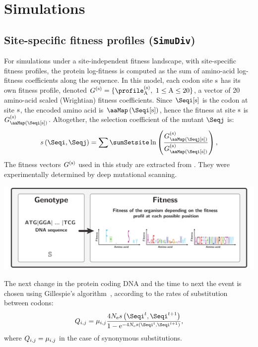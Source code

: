 \documentclass{article}
\begin{document}
	\section{Simulations}
	\label{sec:supp-mat-simulations}

	\subsection{Site-specific fitness profiles (\texttt{SimuDiv})}
	\label{subsec:independent-fitness-profiles}
	For simulations under a site-independent fitness landscape, with site-specific fitness profiles, the protein log-fitness is computed as the sum of amino-acid log-fitness coefficients along the sequence.
	In this model, each {codon} site $\text{s}$ has its own fitness profile, denoted $\Profile\siteexp = \{ \profile\siteexp_{\aminoacid},\ 1 \leq \aminoacid \leq 20 \}$, a vector of 20 amino-acid scaled (Wrightian) fitness coefficients.
	Since $\Seqi[ \site ]$ is the {codon} at site $\text{s}$, the encoded amino acid is $\aaMap \left( \Seqi[ \site ] \right)$, hence the fitness at site $\text{s}$ is $\Profile\siteexp_{\aaMap \left( \Seqi[ \site ] \right)}$.
	Altogether, the selection coefficient of the mutant $\Seqj$ is:
	\begin{equation}
		s \left( \Seqi,\Seqj\right) = \sum\limits\sumSetsite \ln \left( \dfrac{\Profile\siteexp_{\aaMap \left( \Seqj[ \site ] \right)}}{\Profile\siteexp_{\aaMap \left( \Seqi[ \site ] \right)}} \right),
	\end{equation}
	The fitness vectors $G^{(\text{s})}$ used in this study are extracted from \citet{Bloom2017}.
	They were experimentally determined by deep mutational scanning.
	\begin{center}
		\includegraphics[width=\textwidth] {ModelSimuDiv}
	\end{center}

	The next change in the protein coding {DNA} and the time to next the event is chosen using Gillespie's algorithm~\citep{Gillespie1977}, according to the rates of {substitution} between codons:
	\begin{equation}
	{\submatrix_{\itoj}}
		= \mu_{\itoj} \dfrac{4 \Ne s \left( \Seqi^{t},\Seqi^{t+1}\right)}{{1 - \e^{-4 \Ne s \left( \Seqi^{t},\Seqi^{t+1}\right)} }},
	\end{equation}
	where ${Q_{{i}, {j}}} = \mu_{{i}, {j}}$ in the case of {synonymous} substitutions.
\end{document}
